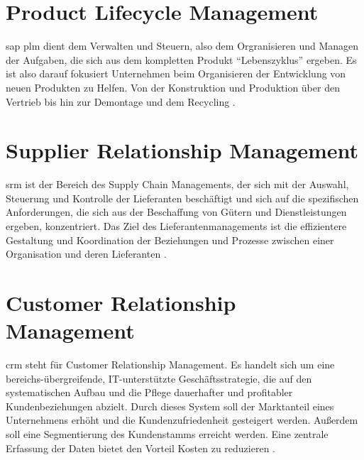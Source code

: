 \section{Product Lifecycle Management}
\label{sec:plm-definition}
\gls{sap} \gls{plm} dient dem Verwalten und Steuern, also dem Orgranisieren und Managen der Aufgaben, die sich aus dem kompletten Produkt "`Lebenszyklus"' ergeben. Es ist also darauf fokusiert Unternehmen beim Organisieren der Entwicklung von neuen Produkten zu Helfen. Von der Konstruktion und Produktion über den Vertrieb bis hin zur Demontage und dem Recycling \cite{PLMDefinition}.

\section{Supplier Relationship Management}
\label{sec:srm-definition}
\gls{srm} ist der Bereich des Supply Chain Managements, der sich mit der Auswahl, Steuerung und Kontrolle der Lieferanten beschäftigt und sich auf die spezifischen Anforderungen, die sich aus der Beschaffung von Gütern und Dienstleistungen ergeben, konzentriert. Das Ziel des Lieferantenmanagements ist die effizientere Gestaltung und Koordination der Beziehungen und Prozesse zwischen einer Organisation und deren Lieferanten \cite{SRMDefinition}.

\section{Customer Relationship Management}
\label{sec:crm-definition}
\gls{crm} steht für Customer Relationship Management. Es handelt sich um eine bereichs-übergreifende, IT-unterstützte Geschäftsstrategie, die auf den systematischen Aufbau und die Pflege dauerhafter und profitabler Kundenbeziehungen abzielt. Durch dieses System soll der Marktanteil eines Unternehmens erhöht und die Kundenzufriedenheit gesteigert werden. Außerdem soll eine Segmentierung des Kundenstamms erreicht werden. Eine zentrale Erfassung der Daten bietet den Vorteil Kosten zu reduzieren \cite{ERPDefinition}.

